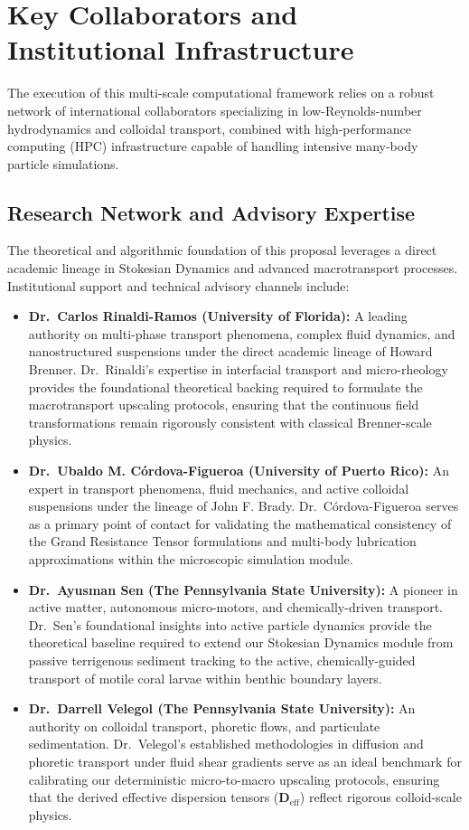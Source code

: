 \section{Key Collaborators and Institutional Infrastructure}
\label{sec:collaborators}

The execution of this multi-scale computational framework relies on a robust network of international collaborators specializing in low-Reynolds-number hydrodynamics and colloidal transport, combined with high-performance computing (HPC) infrastructure capable of handling intensive many-body particle simulations.

\subsection{Research Network and Advisory Expertise}
The theoretical and algorithmic foundation of this proposal leverages a direct academic lineage in Stokesian Dynamics and advanced macrotransport processes. Institutional support and technical advisory channels include:
\begin{itemize}
    \item \textbf{Dr.~Carlos Rinaldi-Ramos (University of Florida):} A leading authority on multi-phase transport phenomena, complex fluid dynamics, and nanostructured suspensions under the direct academic lineage of Howard Brenner. Dr.~Rinaldi's expertise in interfacial transport and micro-rheology provides the foundational theoretical backing required to formulate the macrotransport upscaling protocols, ensuring that the continuous field transformations remain rigorously consistent with classical Brenner-scale physics.
    \item \textbf{Dr.~Ubaldo M. C\'{o}rdova-Figueroa (University of Puerto Rico):} An expert in transport phenomena, fluid mechanics, and active colloidal suspensions under the lineage of John F. Brady. Dr.~C\'{o}rdova-Figueroa serves as a primary point of contact for validating the mathematical consistency of the Grand Resistance Tensor formulations and multi-body lubrication approximations within the microscopic simulation module.
    \item \textbf{Dr.~Ayusman Sen (The Pennsylvania State University):} A pioneer in active matter, autonomous micro-motors, and chemically-driven transport. Dr.~Sen's foundational insights into active particle dynamics provide the theoretical baseline required to extend our Stokesian Dynamics module from passive terrigenous sediment tracking to the active, chemically-guided transport of motile coral larvae within benthic boundary layers.
    \item \textbf{Dr.~Darrell Velegol (The Pennsylvania State University):} An authority on colloidal transport, phoretic flows, and particulate sedimentation. Dr.~Velegol's established methodologies in diffusion and phoretic transport under fluid shear gradients serve as an ideal benchmark for calibrating our deterministic micro-to-macro upscaling protocols, ensuring that the derived effective dispersion tensors ($\bm{D}_{\text{eff}}$) reflect rigorous colloid-scale physics.
\end{itemize}

